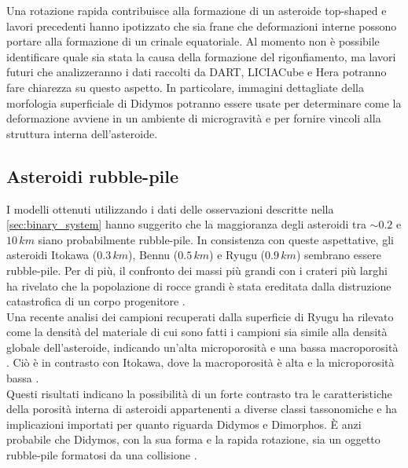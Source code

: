 \documentclass[a4paper,11pt,openright]{book}
\begin{document}
Una rotazione rapida contribuisce alla formazione di un asteroide top-shaped e lavori precedenti \citep{walsh_rotational_2008, walsh_spin-up_2012} hanno ipotizzato che sia frane che deformazioni interne possono portare alla formazione di un crinale equatoriale. Al momento non è possibile identificare quale sia stata la causa della formazione del rigonfiamento, ma lavori futuri che analizzeranno i dati raccolti da DART, LICIACube e Hera potranno fare chiarezza su questo aspetto. In particolare, immagini dettagliate della morfologia superficiale di Didymos potranno essere usate per determinare come la deformazione avviene in un ambiente di microgravità e per fornire vincoli alla struttura interna dell'asteroide.

\subsection{Asteroidi rubble-pile}
I modelli ottenuti utilizzando i dati delle osservazioni descritte nella \cref{sec:binary_system} hanno suggerito che la maggioranza degli asteroidi tra $\sim 0.2$ e $10\,km$ siano probabilmente rubble-pile. In consistenza con queste aspettative, gli asteroidi Itokawa ($0.3\,km$), Bennu ($0.5\,km$) e Ryugu ($0.9\,km$) sembrano essere rubble-pile. Per di più, il confronto dei massi più grandi con i crateri più larghi ha rivelato che la popolazione di rocce grandi è stata ereditata dalla distruzione catastrofica di un corpo progenitore \citep{DellaGiustina2019}.\\
Una recente analisi dei campioni recuperati dalla superficie di Ryugu ha rilevato come la densità del materiale di cui sono fatti i campioni sia simile alla densità globale dell'asteroide, indicando un'alta microporosità e una bassa macroporosità \citep{pilorget_first_2021}. Ciò è in contrasto con Itokawa, dove la macroporosità è alta e la microporosità bassa \citep{tsuchiyama_three-dimensional_2014}.\\
Questi risultati indicano la possibilità di un forte contrasto tra le caratteristiche della porosità interna di asteroidi appartenenti a diverse classi tassonomiche e ha implicazioni importati per quanto riguarda Didymos e Dimorphos. È anzi probabile che Didymos, con la sua forma e la rapida rotazione, sia un oggetto rubble-pile formatosi da una collisione \citep{zhang_creep_2021}. %
\end{document}
